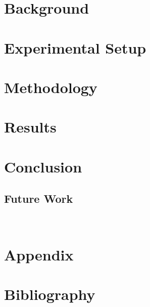 \documentclass[a4paper]{article}
\begin{document}
\newpage

\setcounter{secnumdepth}{4}
\setcounter{tocdepth}{2}
\tableofcontents
\newpage

\section{Background}\label{sec:Background}




\section{Experimental Setup}\label{ExperimentalSetup}



\section{Methodology}\label{sec:Methodology}

\section{Results} \label{sec:Results}

\section{Conclusion}\label{sec:Conclusion}

\subsection{Future Work}\label{sec:Future Work}

\newpage\\
\section*{Appendix}

\newpage

\newpage

\newpage


\newpage
\section*{Bibliography}
\printbibliography[heading=none]\\
\end{document}
